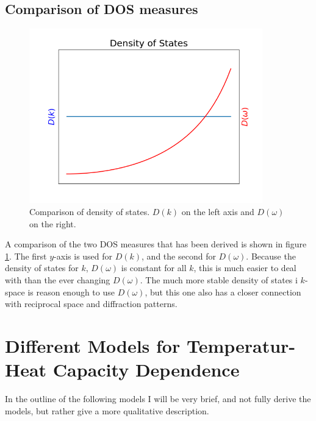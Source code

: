 \documentclass[11pt]{amsart}
\begin{document}
\subsection{Comparison of DOS measures}
\begin{figure}
\centering
	\includegraphics[width = 0.9\textwidth]{DOS.png}
	\caption{Comparison of density of states. $D(k)$ on the left axis and $D(\omega)$ on the right.}
	\label{fig:DOS}
\end{figure}

A comparison of the two DOS measures that has been derived is shown in figure \ref{fig:DOS}. The first $y$-axis is used for $D(k)$, and the second for $D(\omega)$. Because the density of states for $k$, $D(\omega)$ is constant for all $k$, this is much easier to deal with than the ever changing $D(\omega)$. The much more stable density of states i $k$-space is reason enough to use $D(\omega)$, but this one also has a closer connection with reciprocal space and diffraction patterns.

\section{Different Models for Temperatur-Heat Capacity Dependence}
In the outline of the following models I will be very brief, and not fully derive the models, but rather give a more qualitative description.
\end{document}
